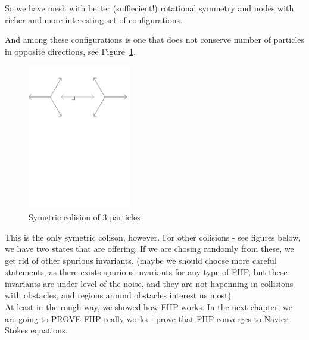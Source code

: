 So we have mesh with better (suffiecient!) rotational symmetry and nodes with richer and more interesting set of configurations.\

And among these configurations is one that does not conserve number of particles in opposite directions, see Figure~\ref{symm}.\

\begin{figure}[htbp]
 \centering
 \includegraphics[width=0.4\textwidth]{./img/fhp_sym_col}
 \caption{Symetric colision of 3 particles}
 \label{symm}
 
\end{figure}



This is the only symetric colison, however.
For other colisions - see figures below, we have two states that are offering.
If we are chosing randomly from these,
we get rid of other spurious invariants.
(maybe we should choose more careful statements, as there exists spurious invariants for any type of FHP, 
but these invariants are under level of the noise, 
and they are not hapenning in collisions with obstacles, 
and regions around obstacles interest us most).\\


At least in the rough way, we showed how FHP works.
In the next chapter, we are going to PROVE FHP really works - prove that FHP converges to Navier-Stokes equations.